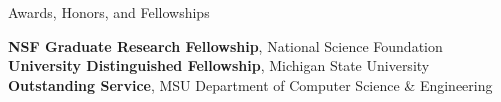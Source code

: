 \begin{rubric}{Awards, Honors, and Fellowships}

\entry*[2014 -- 2017] \textbf{NSF Graduate Research Fellowship}, National Science Foundation 
%
\entry*[2013 -- 2018] \textbf{University Distinguished Fellowship}, Michigan State University 
%
\entry*[2017] \textbf{Outstanding Service}, MSU Department of Computer Science \& Engineering 
%

\end{rubric}